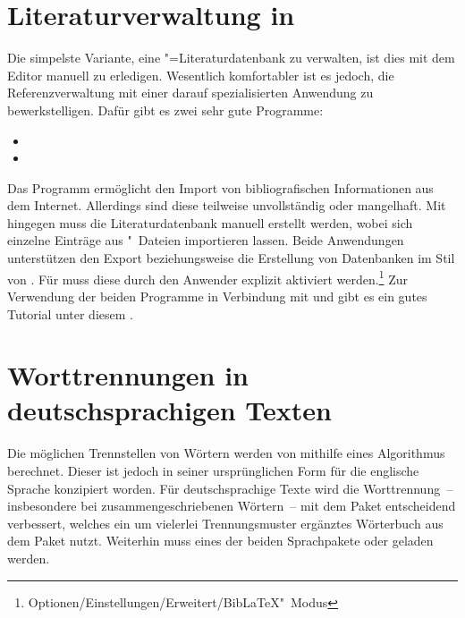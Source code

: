 \section{Literaturverwaltung in }
%
Die simpelste Variante, eine "=Literaturdatenbank zu verwalten, 
ist dies mit dem Editor manuell zu erledigen. Wesentlich komfortabler ist es 
jedoch, die Referenzverwaltung mit einer darauf spezialisierten Anwendung zu 
bewerkstelligen. Dafür gibt es zwei sehr gute Programme:
%
\begin{itemize}
\item {}
\item {}
\end{itemize}
%
Das Programm  ermöglicht den Import von bibliografischen 
Informationen aus dem Internet. Allerdings sind diese teilweise unvollständig 
oder mangelhaft. Mit  hingegen muss die Literaturdatenbank 
manuell erstellt werden, wobei sich einzelne Einträge aus "~Dateien 
importieren lassen. Beide Anwendungen unterstützen den Export beziehungsweise 
die Erstellung von Datenbanken im Stil von . Für 
 muss diese durch den Anwender explizit aktiviert 
werden.\footnote{Optionen/Einstellungen/Erweitert/BibLaTeX"~Modus} 
Zur Verwendung der beiden Programme in Verbindung mit  und 
 gibt es ein gutes Tutorial unter diesem
.



\section{Worttrennungen in deutschsprachigen Texten}
%
Die möglichen Trennstellen von Wörtern werden von  mithilfe 
eines Algorithmus berechnet. Dieser ist jedoch in seiner ursprünglichen Form 
für die englische Sprache konzipiert worden. Für deutschsprachige Texte wird 
die Worttrennung~-- insbesondere bei zusammengeschriebenen Wörtern~-- mit dem 
Paket  entscheidend verbessert, welches ein um vielerlei 
Trennungsmuster ergänztes Wörterbuch aus dem Paket  
nutzt. Weiterhin muss eines der beiden Sprachpakete  oder
 geladen werden. 

